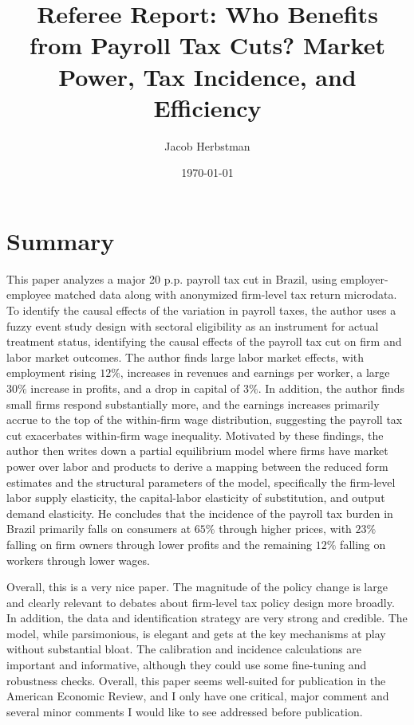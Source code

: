 \documentclass{article}
\title{Referee Report: Who Benefits from Payroll Tax Cuts? Market Power, Tax Incidence, and Efficiency}
\author{Jacob Herbstman}
\date{\today}
\begin{document}
\maketitle

\section*{Summary}

This paper analyzes a major 20 p.p. payroll tax cut in Brazil, using employer-employee matched data along 
with anonymized firm-level tax return microdata. To identify the causal effects of the variation in payroll taxes, 
the author uses a fuzzy event study design with sectoral eligibility as an instrument for actual treatment status, identifying the causal effects of the payroll tax cut on firm and labor market outcomes. 
The author finds large labor market effects, with employment rising 
$12\%$, increases in revenues and earnings per worker, a large $30\%$ increase in profits, and a drop in capital of $3\%$.
In addition, the author finds small firms respond substantially more, and the earnings increases primarily accrue to the top of the within-firm wage distribution, suggesting the payroll tax cut exacerbates within-firm wage inequality.
Motivated by these findings, the author then writes down a partial equilibrium model where firms have market power over labor and products to derive 
a mapping between the reduced form estimates and the structural parameters of the model, specifically the firm-level labor supply elasticity, the capital-labor elasticity of substitution, and output demand elasticity.
He concludes that the incidence of the payroll tax burden in Brazil primarily falls on consumers at $65\%$ through higher prices, 
with $23\%$ falling on firm owners through lower profits and the remaining $12\%$ falling on workers through lower wages. 

Overall, this is a very nice paper. The magnitude of the policy change is large and clearly relevant to debates about firm-level tax policy design more broadly. 
In addition, the data and identification strategy are very strong and credible.
The model, while parsimonious, is elegant and gets at the key mechanisms at play without substantial bloat. 
The calibration and incidence calculations are important and informative, although they could use some fine-tuning and robustness checks.
Overall, this paper seems well-suited for publication in the American Economic Review, and I only have one critical, major comment and several minor comments I would like to see addressed before publication.
\end{document}
